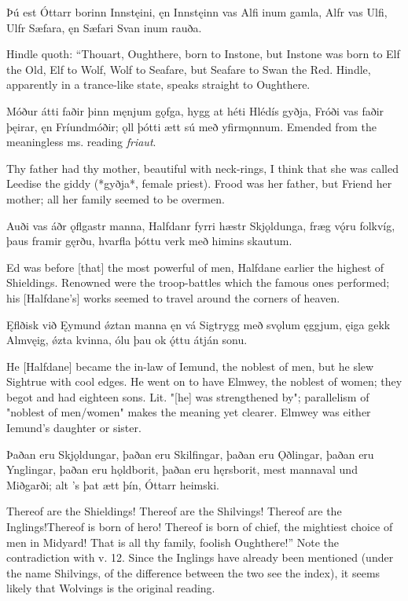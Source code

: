 Þú est Óttarr \hld borinn Innstęini,
ęn Innstęinn vas \hld Alfi inum gamla,
Alfr vas Ulfi, \hld Ulfr Sæfara,
ęn Sæfari \hld Svan inum rauða.

Hindle quoth:
“Thou\footnotemark[1] art, Oughthere, born to Instone, but Instone was born to Elf the Old, Elf to Wolf, Wolf to Seafare, but Seafare to Swan the Red.
\footnotemark[1] Hindle, apparently in a trance-like state, speaks straight to Oughthere.

Móður átti faðir þinn \hld męnjum gǫfga,
hygg at héti \hld Hlédís gyðja,
Fróði vas faðir þęirar, \hld ęn Fríund\footnotemark[1] móðir;
ǫll þótti ætt sú \hld með yfirmǫnnum.
\footnotemark[1] Emended from the meaningless ms. reading \emph{friaut}.

Thy father had thy mother, beautiful with neck-rings, I think that she was called Leedise the giddy (*gyðja*, female priest). Frood was her father, but Friend her mother; all her family seemed to be overmen.

Auði vas áðr \hld ǫflgastr manna,
Halfdanr fyrri \hld hæstr Skjǫldunga,
fræg vǫ́ru folkvíg, \hld þaus framir gęrðu,
hvarfla þóttu verk \hld með himins skautum.
    
Ed was before [that] the most powerful of men, Halfdane earlier the highest of Shieldings. Renowned were the troop-battles which the famous ones performed; his [Halfdane's] works seemed to travel around the corners of heaven.

Ęflðisk við Ęymund \hld ǿztan manna
ęn vá Sigtrygg \hld með svǫlum ęggjum,
ęiga gekk Almvęig, \hld ǿzta kvinna,
ólu þau ok ǫ́ttu \hld átján sonu.
    
He [Halfdane] became the in-law of Iemund\footnotemark[1], the noblest of men, but he slew Sightrue with cool edges. He went on to have Elmwey, the noblest of women; they begot and had eighteen sons.
\footnotemark[1] Lit. "[he] was strengthened by"; parallelism of "noblest of men/women" makes the meaning yet clearer. Elmwey was either Iemund's daughter or sister.

Þaðan eru Skjǫldungar, \hld þaðan eru Skilfingar,
þaðan eru Ǫðlingar, \hld þaðan eru Ynglingar,
þaðan eru hǫldborit, \hld þaðan eru hęrsborit,
mest mannaval \hld und Miðgarði;
alt ’s þat ætt þín, \hld Óttarr heimski.

Thereof are the Shieldings! Thereof are the Shilvings! Thereof are the Inglings!\footnotemark[1] Thereof is born of hero! Thereof is born of chief, the mightiest choice of men in Midyard! That is all thy family, foolish Oughthere!”
\footnotemark[1] Note the contradiction with v. 12. Since the Inglings have already been mentioned (under the name Shilvings, of the difference between the two see the index), it seems likely that Wolvings is the original reading.

